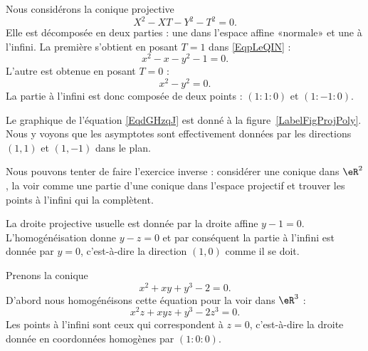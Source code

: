 \begin{example}
    Nous considérons la conique projective
    \begin{equation}    \label{EqpLeQIN}
        X^2-XT-Y^2-T^2=0.
    \end{equation}
    Elle est décomposée en deux parties : une dans l'espace affine «normale» et une à l'infini. La première s'obtient en posant \( T=1\) dans \eqref{EqpLeQIN} :
    \begin{equation}    \label{EqdGHzqJ}
        x^2-x-y^2-1=0.
    \end{equation}
    L'autre est obtenue en posant \( T=0\) :
    \begin{equation}
        x^2-y^2=0.
    \end{equation}
    La partie à l'infini est donc composée de deux points : \( (1:1:0)\) et \( (1:-1:0)\).

    Le graphique de l'équation \eqref{EqdGHzqJ} est donné à la figure~\ref{LabelFigProjPoly}. Nous y voyons que les asymptotes sont effectivement données par les directions \( (1,1)\) et \( (1,-1)\) dans le plan.
    \newcommand{\CaptionFigProjPoly}{Le graphique de \( x^2-x-y^2-1=0\).}
    
\end{example}

Nous pouvons tenter de faire l'exercice inverse : considérer une conique dans \( \eR^2\), la voir comme une partie d'une conique dans l'espace projectif et trouver les points à l'infini qui la complètent.

\begin{example}
    La droite projective usuelle est donnée par la droite affine \( y-1=0\). L'homogénéisation donne \( y-z=0\) et par conséquent la partie à l'infini est donnée par \( y=0\), c'est-à-dire la direction \( (1,0)\) comme il se doit.
\end{example}

\begin{example}
    Prenons la conique
    \begin{equation}
        x^2+xy+y^3-2=0.
    \end{equation}
    D'abord nous homogénéisons cette équation pour la voir dans \( \eR^3\) :
    \begin{equation}
        x^2z+xyz+y^3-2z^3=0.
    \end{equation}
    Les points à l'infini sont ceux qui correspondent à \( z=0\), c'est-à-dire la droite donnée en coordonnées homogènes par \( (1:0:0)\).
\end{example}
